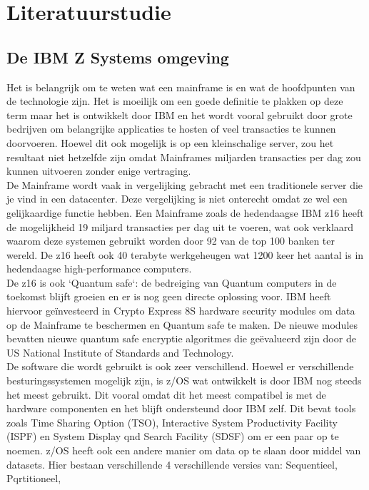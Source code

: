 
\chapter{Literatuurstudie}
\label{ch:literatuurstudie}

\section{De IBM Z Systems omgeving}
\label{sec:De IBM Z Systems omgeving}
Het is belangrijk om te weten wat een mainframe is en wat de hoofdpunten van de technologie zijn. Het is moeilijk om een goede definitie te plakken op deze term maar het is ontwikkelt door IBM en het wordt vooral gebruikt door grote bedrijven om belangrijke applicaties te hosten of veel transacties te kunnen doorvoeren. Hoewel dit ook mogelijk is op een kleinschalige server, zou het resultaat niet hetzelfde zijn omdat Mainframes miljarden transacties per dag zou kunnen uitvoeren zonder enige vertraging. \autocite{BasuMallick2023} \\
De Mainframe wordt vaak in vergelijking gebracht met een traditionele server die je vind in een datacenter. Deze vergelijking is niet onterecht omdat ze wel een gelijkaardige functie hebben. Een Mainframe zoals de hedendaagse IBM z16 heeft de mogelijkheid 19 miljard transacties per dag uit te voeren, wat ook verklaard waarom deze systemen gebruikt worden door 92 van de top 100 banken ter wereld. De z16 heeft ook 40 terabyte werkgeheugen wat 1200 keer het aantal is in hedendaagse high-performance computers. \autocite{Tozzi2022} \\ 
De z16 is ook `Quantum safe`: de bedreiging van Quantum computers in de toekomst blijft groeien en er is nog geen directe oplossing voor. IBM heeft hiervoor geïnvesteerd in Crypto Express 8S hardware security modules om data op de Mainframe te beschermen en Quantum safe te maken. De nieuwe modules bevatten nieuwe quantum safe encryptie algoritmes die geëvalueerd zijn door de US National Institute of Standards and Technology. \autocite{Sayer2022}
\\
De software die wordt gebruikt is ook zeer verschillend. Hoewel er verschillende besturingssystemen mogelijk zijn, is z/OS wat ontwikkelt is door IBM nog steeds het meest gebruikt. Dit vooral omdat dit het meest compatibel is met de hardware componenten en het blijft ondersteund door IBM zelf. Dit bevat tools zoals Time Sharing Option (TSO), Interactive System Productivity Facility (ISPF) en System Display qnd Search Facility (SDSF) om er een paar op te noemen. z/OS heeft ook een andere manier om data op te slaan door middel van datasets. Hier bestaan verschillende 4 verschillende versies van: Sequentieel, Pqrtitioneel, 

